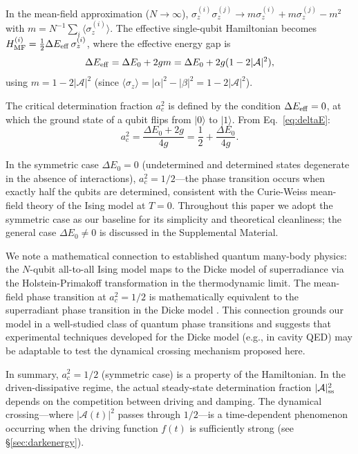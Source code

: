 \documentclass[aps,prd,twocolumn,superscriptaddress]{revtex4-2}
\begin{document}
In the mean-field approximation ($N \to \infty$), $\sigma_z^{(i)}\sigma_z^{(j)} \to m\sigma_z^{(i)} + m\sigma_z^{(j)} - m^2$ with $m = N^{-1}\sum_i\langle\sigma_z^{(i)}\rangle$. The effective single-qubit Hamiltonian becomes $H_{\rm MF}^{(i)} = \frac{1}{2}\Delta E_{\rm eff}\,\sigma_z^{(i)}$, where the effective energy gap is
\begin{equation}
\Delta E_{\rm eff} = \Delta E_0 + 2g m = \Delta E_0 + 2g(1-2|\mathcal{A}|^2),
\label{eq:deltaE}
\end{equation}
using $m = 1 - 2|\mathcal{A}|^2$ (since $\langle\sigma_z\rangle = |\alpha|^2 - |\beta|^2 = 1-2|\mathcal{A}|^2$).

The critical determination fraction $a_c^2$ is defined by the condition $\Delta E_{\rm eff}=0$, at which the ground state of a qubit flips from $|0\rangle$ to $|1\rangle$. From Eq.~\eqref{eq:deltaE}:
\begin{equation}
a_c^2 = \frac{\Delta E_0 + 2g}{4g} = \frac{1}{2} + \frac{\Delta E_0}{4g}.
\label{eq:ac2_equilibrium}
\end{equation}

In the symmetric case $\Delta E_0 = 0$ (undetermined and determined states degenerate in the absence of interactions), $a_c^2 = 1/2$---the phase transition occurs when exactly half the qubits are determined, consistent with the Curie-Weiss mean-field theory of the Ising model at $T=0$. Throughout this paper we adopt the symmetric case as our baseline for its simplicity and theoretical cleanliness; the general case $\Delta E_0 \neq 0$ is discussed in the Supplemental Material.

We note a mathematical connection to established quantum many-body physics: the $N$-qubit all-to-all Ising model maps to the Dicke model of superradiance \cite{Dicke:1954} via the Holstein-Primakoff transformation in the thermodynamic limit. The mean-field phase transition at $a_c^2 = 1/2$ is mathematically equivalent to the superradiant phase transition in the Dicke model \cite{Hepp:1973,Wang:1973}. This connection grounds our model in a well-studied class of quantum phase transitions and suggests that experimental techniques developed for the Dicke model (e.g., in cavity QED) may be adaptable to test the dynamical crossing mechanism proposed here.

In summary, $a_c^2 = 1/2$ (symmetric case) is a property of the Hamiltonian. In the driven-dissipative regime, the actual steady-state determination fraction $|\mathcal{A}|^2_{\rm ss}$ depends on the competition between driving and damping. The dynamical crossing---where $|\mathcal{A}(t)|^2$ passes through $1/2$---is a time-dependent phenomenon occurring when the driving function $f(t)$ is sufficiently strong (see \S\ref{sec:darkenergy}).
\end{document}
